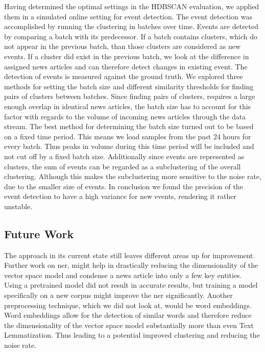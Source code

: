Having determined the optimal settings in the HDBSCAN evaluation,
we applied them in a simulated online setting for event detection.
The event detection was accomplished by running the clustering in batches over time.
Events are detected by comparing a batch with its predecessor.
If a batch contains clusters, which do not appear in the previous batch,
than those clusters are considered as new events.
If a cluster did exist in the previous batch,
we look at the difference in assigned news articles and can therefore detect changes in existing event.
The detection of events is measured against the ground truth.
We explored three methods for setting the batch size and different similarity thresholds for finding pairs of clusters between batches.
Since finding pairs of clusters, requires a large enough overlap in identical news articles,
the batch size has to account for this factor with regards to the volume of incoming news articles
through the data stream. 
The best method for determining the batch size turned out to be based on a fixed time period. 
This means we load samples from the past 24 hours for every batch. 
Thus peaks in volume during this time period will be included and not cut off by a fixed batch size.  
Additionally since events are represented as clusters,
the sum of events can be regarded as a subclustering of the overall clustering.
Although this makes the subclustering more sensitive to the noise rate, due to the smaller size of events.
In conclusion we found the precision of the event detection to have a high variance for new events, 
rendering it rather unstable.

\subsection{Future Work}
\label{subsec:6_future_work}

The approach in its current state still leaves different areas up for improvement.
Further work on \Gls{ner}, might help in drastically reducing the dimensionality of the vector space model
and condense a news article into only a few key entities.
Using a pretrained model did not result in accurate results,
but training a model specifically on a new corpus might improve the \Gls{ner} significantly.
Another preprocessing technique, which we did not look at, would be word embeddings.
Word embeddings allow for the detection of similar words and therefore reduce the dimensionality
of the vector space model substantially more than even Text Lemmatization.
Thus leading to a potential improved clustering and reducing the noise rate.

